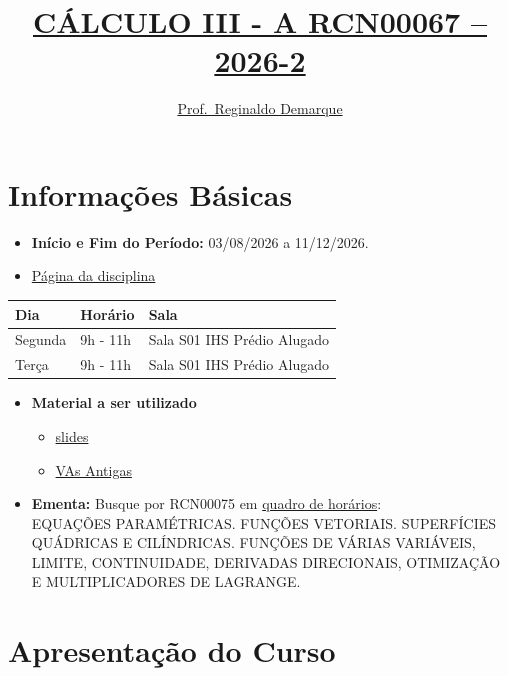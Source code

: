 \documentclass[
  letterpaper,
  DIV=11,
  numbers=noendperiod]{scrartcl}
\title{\href{https://demarque.mat.br/calculoIII/2026-1/c3-A-2026-1.html}{CÁLCULO
III - A RCN00067 -- 2026-2}}
\author{\href{https://www.demarque.mat.br}{Prof.~Reginaldo Demarque}}
\date{}
\newcounter{none} %
\renewcommand*\contentsname{Table of contents}
\newcommand\contentsname{Table of contents}
\begin{document}
\maketitle

\renewcommand*\contentsname{Table of contents}
{
\setcounter{tocdepth}{3}
\tableofcontents
}

\section{Informações Básicas}\label{informauxe7uxf5es-buxe1sicas}

\begin{itemize}
\item
  \textbf{Início e Fim do Período:} 03/08/2026 a 11/12/2026.
\item
  \href{https://demarque.mat.br/calculoIII/2026-2/c3-A-2026-2.html}{Página
  da disciplina}
\end{itemize}

{\def\LTcaptype{none} %
\begin{longtable}[]{@{}lll@{}}
\toprule\noalign{}
Dia & Horário & Sala \\
\midrule\noalign{}
\endhead
\bottomrule\noalign{}
\endlastfoot
Segunda & 9h - 11h & Sala S01 IHS Prédio Alugado \\
Terça & 9h - 11h & Sala S01 IHS Prédio Alugado \\
\end{longtable}
}

\begin{itemize}
\item
  \textbf{Material a ser utilizado}

  \begin{itemize}
  \item
    \href{https://reginaldodr.github.io/slides/calculo3/calculo3.pdf}{slides}
  \item
    \href{https://demarque.mat.br/calculoIII/provas/}{VAs Antigas}
  \end{itemize}
\item
  \textbf{Ementa:} Busque por RCN00075 em
  \href{https://app.uff.br/graduacao/quadrodehorarios/}{quadro de
  horários}:\\
  EQUAÇÕES PARAMÉTRICAS. FUNÇÕES VETORIAIS. SUPERFÍCIES QUÁDRICAS E
  CILÍNDRICAS. FUNÇÕES DE VÁRIAS VARIÁVEIS, LIMITE, CONTINUIDADE,
  DERIVADAS DIRECIONAIS, OTIMIZAÇÃO E MULTIPLICADORES DE LAGRANGE.
\end{itemize}

\section{Apresentação do Curso}\label{apresentauxe7uxe3o-do-curso}
\end{document}
